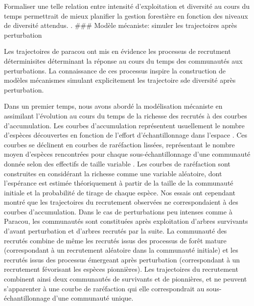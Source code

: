 \documentclass[
  11pt,
  french,
  A4paper,
  extrafontsizes,onecolumn,openright
  ]{memoir}
\begin{document}
Formaliser une telle relation entre intensité d'exploitation et
diversité au cours du temps permettrait de mieux planifier la gestion
forestière en fonction des niveaux de diversité attendus. . \#\#\#
Modèle mécaniste: simuler les trajectoires après perturbation

Les trajectoires de paracou ont mis en évidence les processus de
recrutment déterminisites déterminant la réponse au cours du temps des
communautés aux perturbations. La connaissance de ces processus inspire
la construction de modèles mécanismes simulant explicitement les
trajectoire sde diversité après perturbation.

Dans un premier temps, nous avons abordé la modélisation mécaniste en
assimilant l'évolution au cours du temps de la richesse des recrutés à
des courbes d'accumulation. Les courbes d'accumulation représentent
usuellement le nombre d'espèces découvertes en fonction de l'effort
d'échantillonnage dans l'espace \autocite{Gotelli2001}. Ces courbes se
déclinent en courbes de raréfaction lissées, représentant le nombre
moyen d'espèces rencontrées pour chaque sous-échantillonnage d'une
communauté donnée selon des effectifs de taille variable
\autocite{Ugland2003}. Les courbes de raréfaction sont construites en
considérant la richesse comme une variable aléatoire, dont l'espérance
est estimée théoriquement à partir de la taille de la communauté
initiale et la probabilité de tirage de chaque espèce. Nos essais ont
cependant montré que les trajectoires du recrutement observées ne
correspondaient à des courbes d'accumulation. Dans le cas de
perturbations peu intenses comme à Paracou, les communautés sont
constituées après exploitation d'arbres survivants d'avant perturbation
et d'arbres recrutés par la suite. La communauté des recrutés combine de
même les recrutés issus des processus de forêt mature (correspondant à
un recrutement aléatoire dans la communauté initiale) et les recrutés
issus des processus émergeant après perturbation (correspondant à un
recrutement févorisant les espèces pionnières). Les trajectoires du
recrutement combinent ainsi deux communautés de survivants et de
pionnières, et ne peuvent s'apparenter à une courbe de raréfaction qui
elle correspondrait au sous-échantillonnage d'une communauté unique.
\end{document}
